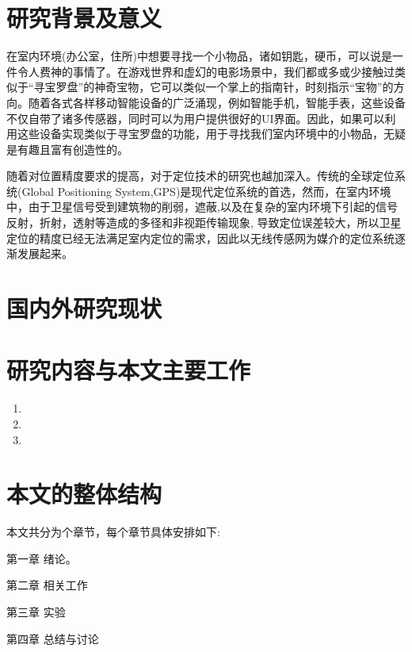 \documentclass[winfonts]{njuthesis}
\begin{document}
	\section{研究背景及意义}
		在室内环境(办公室，住所)中想要寻找一个小物品，诸如钥匙，硬币，可以说是一件令人费神的事情了\cite{HyperEarAbstract}。在游戏世界和虚幻的电影场景中，我们都或多或少接触过类似于“寻宝罗盘”的神奇宝物，它可以类似一个掌上的指南针，时刻指示“宝物”的方向。随着各式各样移动智能设备的广泛涌现，例如智能手机，智能手表，这些设备不仅自带了诸多传感器，同时可以为用户提供很好的UI界面。因此，如果可以利用这些设备实现类似于寻宝罗盘的功能，用于寻找我们室内环境中的小物品，无疑是有趣且富有创造性的。
		
		随着对位置精度要求的提高，对于定位技术的研究也越加深入。传统的全球定位系统(Global Positioning System,GPS)\cite{wikipedia_GPS}是现代定位系统的首选，然而，在室内环境中，由于卫星信号受到建筑物的削弱，遮蔽,以及在复杂的室内环境下引起的信号反射，折射，透射等造成的多径和非视距传输现象, 导致定位误差较大，所以卫星定位的精度已经无法满足室内定位的需求，因此以无线传感网为媒介的定位系统逐渐发展起来。
		
	\section{国内外研究现状}
		
		
		


	\section{研究内容与本文主要工作}

		\begin{enumerate}
		\item
			
		\item
			
		\item 
			
		\end{enumerate}

	\section{本文的整体结构}
		本文共分为个章节，每个章节具体安排如下:
		
		第一章 绪论。
		 
		第二章 相关工作
		
		第三章 实验
		
		第四章 总结与讨论
		
\end{document}
